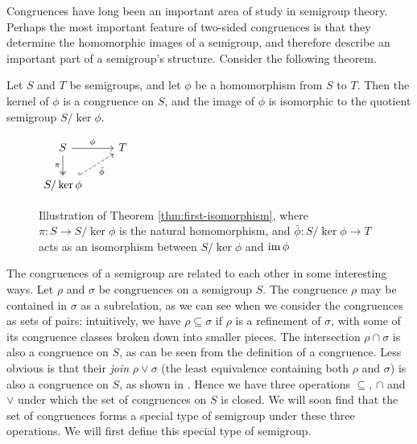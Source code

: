 Congruences have long been an important area of study in semigroup theory.
Perhaps the most important feature of two-sided congruences is that they
determine the homomorphic images of a semigroup, and therefore describe an
important part of a semigroup's structure.  Consider the following theorem.

\begin{theorem}
  \label{thm:first-isomorphism}
  Let $S$ and $T$ be semigroups, and let $\phi$ be a homomorphism from $S$ to
  $T$.  Then the kernel of $\phi$ is a congruence on $S$, and the image of
  $\phi$ is isomorphic to the quotient semigroup $S / \ker{\phi}$.
\end{theorem}

\begin{figure}[h]
  \centering
  $
  \begin{tikzcd}
    S \ar[d, two heads, "\pi"'] \ar[r, "\phi"] & T \\
    S / \ker{\phi} \ar[ur, dashed, hook, "\bar\phi"']
  \end{tikzcd}
  $
  \caption[Illustration of Theorem \ref{thm:first-isomorphism}]
  {Illustration of Theorem \ref{thm:first-isomorphism}, where
    $\pi : S \to S/\ker\phi$ is the natural homomorphism, and
    $\bar\phi: S/\ker\phi \to T$ acts as an isomorphism between $S/\ker\phi$ and
    $\operatorname{im}\phi$}
  \label{fig:first-isomorphism-theorem}
\end{figure}

The congruences of a semigroup are related to each other in some interesting
ways.  Let $\rho$ and $\sigma$ be congruences on a semigroup $S$.  The
congruence $\rho$ may be contained in $\sigma$ as a subrelation, as we can see
when we consider the congruences as sets of pairs: intuitively, we have
$\rho \subseteq \sigma$ if $\rho$ is a refinement of $\sigma$, with some of its
congruence classes broken down into smaller pieces.  The intersection
$\rho \cap \sigma$ is also a congruence on $S$, as can be seen from the
definition of a congruence.  Less obvious is that their \textit{join}
$\rho \vee \sigma$ (the least equivalence containing both $\rho$ and $\sigma$)
is also a congruence on $S$, as shown in \cite[\S1.5]{howie}.  Hence we have
three operations $\subseteq$, $\cap$ and $\vee$ under which the set of
congruences on $S$ is closed.  We will soon find that the set of congruences
forms a special type of semigroup under these three operations.  We will first
define this special type of semigroup.

